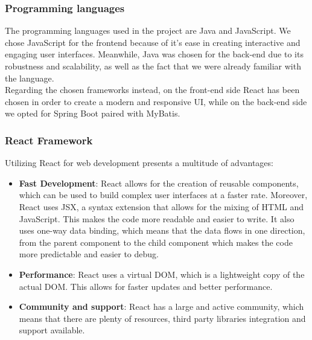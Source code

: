 \documentclass[table, 12pt]{article}
\begin{document}
\subsubsection{Programming languages}
The programming languages used in the project are Java and JavaScript. We chose JavaScript for the frontend because of it's ease in creating interactive and engaging user interfaces. Meanwhile, Java was chosen for the back-end due to its robustness and scalability, as well as the fact that we were already familiar with the language.\\
Regarding the chosen frameworks instead, on the front-end side React has been chosen in order to create a modern and responsive UI, while on the back-end side we opted for Spring Boot paired with MyBatis.

\subsubsection{React Framework}
Utilizing React for web development presents a multitude of advantages:
\begin{itemize}
    \item \textbf{Fast Development}: React allows for the creation of reusable components, which can be used to build complex user interfaces at a faster rate. Moreover, React uses JSX, a syntax extension that allows for the mixing of HTML and JavaScript. This makes the code more readable and easier to write. It also uses one-way data binding, which means that the data flows in one direction, from the parent component to the child component which makes the code more predictable and easier to debug.
    \item \textbf{Performance}: React uses a virtual DOM, which is a lightweight copy of the actual DOM. This allows for faster updates and better performance. 
    \item \textbf{Community and support}: React has a large and active community, which means that there are plenty of resources, third party libraries integration and support available.
\end{itemize}
\end{document}
